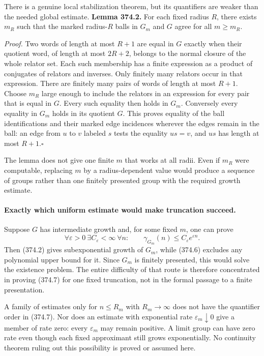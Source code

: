 \documentclass[11pt]{article}
\begin{document}
There is a genuine local stabilization theorem, but its quantifiers
are weaker than the needed global estimate.
\textbf{Lemma 374.2.} For each fixed radius $R$, there exists $m_R$
such that the marked radius-$R$ balls in $G_m$ and $G$ agree for all
$m\ge m_R$.

\emph{Proof.} Two words of length at most $R+1$ are equal in $G$
exactly when their quotient word, of length at most $2R+2$, belongs
to the normal closure of the whole relator set. Each such membership
has a finite expression as a product of conjugates of relators and
inverses. Only finitely many relators occur in that expression.
There are finitely many pairs of words of length at most $R+1$.
Choose $m_R$ large enough to include the relators in an expression
for every pair that is equal in $G$. Every such equality then holds
in $G_m$. Conversely every equality in $G_m$ holds in its quotient
$G$. This proves equality of the ball identifications and their marked
edge incidences wherever the edges remain in the ball: an edge from
$u$ to $v$ labeled $s$ tests the equality $us=v$, and $us$ has
length at most $R+1$.\hfill$\square$

The lemma does not give one finite $m$ that works at all radii. Even
if $m_R$ were computable, replacing $m$ by a radius-dependent value
would produce a sequence of groups rather than one finitely presented
group with the required growth estimate.

\paragraph{Exactly which uniform estimate would make truncation succeed.}
Suppose $G$ has intermediate growth and, for some fixed $m$, one can
prove
\[
 \forall\varepsilon>0\ \exists C_\varepsilon<\infty\ 
 \forall n:\qquad\gamma_{G_m}(n)\le C_\varepsilon e^{\varepsilon n}.
 \tag{374.7}
\]
Then (374.2) gives subexponential growth of $G_m$, while (374.6)
excludes any polynomial upper bound for it. Since $G_m$ is finitely
presented, this would solve the existence problem. The entire difficulty
of that route is therefore concentrated in proving (374.7) for one
fixed truncation, not in the formal passage to a finite presentation.

A family of estimates only for $n\le R_m$ with $R_m\to\infty$ does
not have the quantifier order in (374.7). Nor does an estimate with
exponential rate $\varepsilon_m\downarrow0$ give a member of rate
zero: every $\varepsilon_m$ may remain positive. A limit group can
have zero rate even though each fixed approximant still grows
exponentially. No continuity theorem ruling out this possibility is
proved or assumed here.
\end{document}
